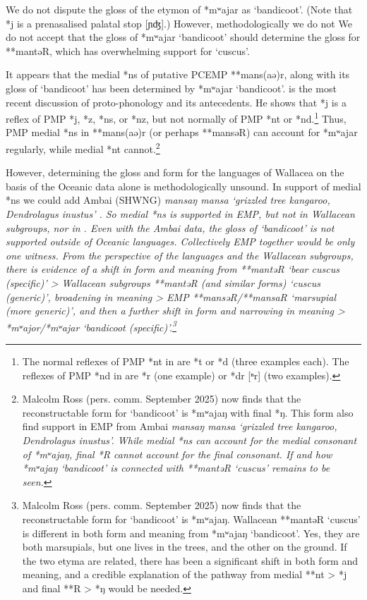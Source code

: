 We do not dispute the gloss of the  etymon of *mʷajar as ‘bandicoot’.
(Note that  *j is a prenasalised palatal stop [ɲʤ].)
However, methodologically we do not We do not accept
that the gloss of  *mʷajar ‘bandicoot’ should
determine the gloss for **mantəR,
which has overwhelming support for ‘cuscus’.

It appears that the medial *ns of putative PCEMP **mans(aə)r,
along with its gloss of ‘bandicoot’ has been determined by  *mʷajar ‘bandicoot’.
\citet[27--46]{ RossPawleyOsmond2023} is the most recent discussion
of  proto-phonology and its antecedents.
He shows that  *j is a reflex of PMP *j,
*z, *ns, or *nz, but not normally of PMP *nt or *nd.\footnote{
		The normal reflexes of PMP *nt in  are *t or *d (three examples each).
		The reflexes of PMP *nd in  are *r (one example) or
		*dr [ⁿr] (two examples).}
Thus, PMP medial *ns in **mans(aə)r (or perhaps **mansəR) can account
for  *mʷajar regularly,
while medial *nt cannot.\footnote{
  Malcolm Ross (pers. comm. September 2025) now finds that the
	reconstructable form for  ‘bandicoot’ is *mʷajaŋ with final *ŋ.
	This form also find support in EMP from Ambai
	\it{mansaŋ} {\tl} \it{mansa} ‘grizzled tree kangaroo, \it{Dendrolagus inustus}’.
	While medial *ns can account for the medial consonant
	of  *mʷajaŋ, final *R cannot account for the final consonant.
	If and how  *mʷajaŋ `bandicoot' is connected with 
	**mantəR ‘cuscus’ remains to be seen.}

However, determining the gloss
and form for the languages of Wallacea on the basis
of the Oceanic data alone is methodologically unsound.
In support of medial *ns we could add Ambai (SHWNG) \it{mansaŋ
{\tl} mansa} ‘grizzled tree kangaroo, \it{Dendrolagus inustus}’ \citep{Price2002}.
So medial *ns is supported in EMP,
but not in Wallacean subgroups, nor in .
Even with the Ambai data,
the gloss of ‘bandicoot’ is not supported outside of Oceanic languages.
Collectively EMP together would be only one witness.
From the perspective of the  languages
and the Wallacean subgroups,
there is evidence of a shift in form
and meaning from  **mantəR ‘bear cuscus (specific)’
> Wallacean subgroups **mantəR (and similar forms) ‘cuscus (generic)’,
broadening in meaning > EMP **mansəR/**mansaR ‘marsupial (more
generic)’, and then a further shift in form
and narrowing in meaning >  *mʷajor/*mʷajar ‘bandicoot
(specific)’.\footnote{
		Malcolm Ross (pers. comm. September 2025) now finds that
		the reconstructable form for  ‘bandicoot’ is *mʷajaŋ.
		Wallacean **mantəR ‘cuscus’ is different
		in both form and meaning from  *mʷajaŋ ‘bandicoot’.
		Yes, they are both marsupials,
		but one lives in the trees,
		and the other on the ground.
		If the two etyma are related,
		there has been a significant shift in both form
		and meaning, and a credible explanation of the pathway from medial
		**nt >  *j and final **R >  *ŋ would be needed.}

